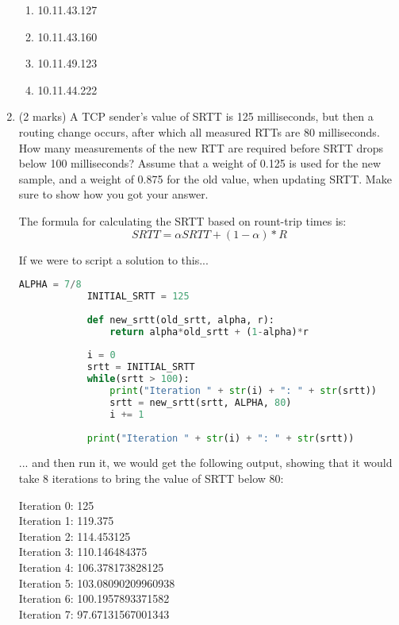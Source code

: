 \documentclass[10pt]{amsart}
\begin{document}
\begin{enumerate}
        \begin{enumerate}
            \item 10.11.43.127\\
            \item 10.11.43.160\\
            \item 10.11.49.123\\
            \item 10.11.44.222\\
        \end{enumerate} 
    \item (2 marks) A TCP sender’s value of SRTT is 125 milliseconds, but then a
        routing change occurs, after which all measured RTTs are 80
        milliseconds. How many measurements of the new RTT are required before
        SRTT drops below 100 milliseconds? Assume that a weight of 0.125 is used
        for the new sample, and a weight of 0.875 for the old value, when
        updating SRTT. Make sure to show how you got your answer.

        The formula for calculating the SRTT based on rount-trip times is:
        \[ SRTT = \alpha SRTT + (1-\alpha) * R \]

        If we were to script a solution to this...

        \begin{lstlisting}[language=python]
            ALPHA = 7/8
            INITIAL_SRTT = 125
            
            def new_srtt(old_srtt, alpha, r):
                return alpha*old_srtt + (1-alpha)*r
            
            i = 0
            srtt = INITIAL_SRTT
            while(srtt > 100):
                print("Iteration " + str(i) + ": " + str(srtt))
                srtt = new_srtt(srtt, ALPHA, 80)
                i += 1
            
            print("Iteration " + str(i) + ": " + str(srtt))
        \end{lstlisting}

        ... and then run it, we would get the following output, showing that it
        would take 8 iterations to bring the value of SRTT below 80:

        Iteration 0: 125\\
        Iteration 1: 119.375\\
        Iteration 2: 114.453125\\
        Iteration 3: 110.146484375\\
        Iteration 4: 106.378173828125\\
        Iteration 5: 103.08090209960938\\
        Iteration 6: 100.1957893371582\\
        Iteration 7: 97.67131567001343\\


\end{enumerate}
\end{document}
